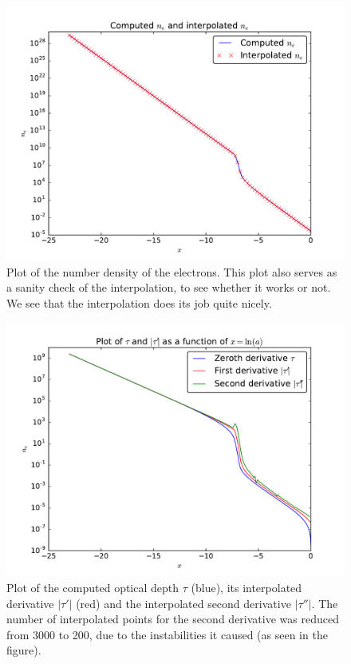 \documentclass[12pt]{article}
\begin{document}
\begin{figure}[H]
\centering
\includegraphics[width=\linewidth]{Plots/InterpolatedElectronDensity.pdf}
\caption{Plot of the number density of the electrons. This plot also serves as a sanity check of the interpolation, to see whether it works or not. We see that the interpolation does its job quite nicely. }
\end{figure} 

\begin{figure}[H]
\centering
\includegraphics[width=\linewidth]{Plots/FirstDerivativeTau.pdf}
\caption{Plot of the computed optical depth $\tau$  (blue),  its interpolated derivative $|\tau'|$ (red) and the interpolated second derivative $|\tau''|$. The number of interpolated points for the second derivative was reduced from 3000 to 200, due to the instabilities it caused (as seen in the figure).}
\end{figure}
\end{document}
